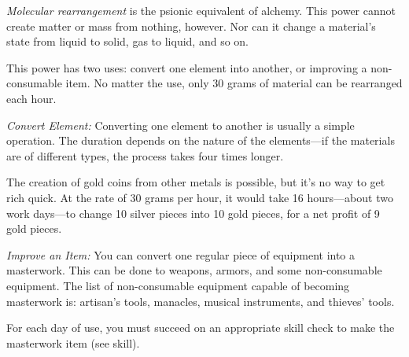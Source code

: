 {
	\emph{Molecular rearrangement} is the psionic equivalent of alchemy. This power cannot create matter or mass from nothing, however. Nor can it change a material's state from liquid to solid, gas to liquid, and so on.%

	This power has two uses: convert one element into another, or improving a non-consumable item. No matter the use, only 30 grams of material can be rearranged each hour.

	\textit{Convert Element:} Converting one element to another is usually a simple operation. The duration depends on the nature of the elements---if the materials are of different types, the process takes four times longer.



	The creation of gold coins from other metals is possible, but it's no way to get rich quick. At the rate of 30 grams per hour, it would take 16 hours---about two work days---to change 10 silver pieces into 10 gold pieces, for a net profit of 9 gold pieces.

	\textit{Improve an Item:} You can convert one regular piece of equipment into a masterwork. This can be done to weapons, armors, and some non-consumable equipment. The list of non-consumable equipment capable of becoming masterwork is: artisan's tools, manacles, musical instruments, and thieves' tools.

	For each day of use, you must succeed on an appropriate skill check to make the masterwork item (see  skill).
}